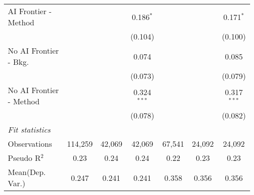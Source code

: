 \begin{tabular}{lcccccc}
   AI Frontier - Method    &               &               & 0.186$^{*}$   &               &               & 0.171$^{*}$\\   
                           &               &               & (0.104)       &               &               & (0.100)\\   
   No AI Frontier - Bkg.   &               &               & 0.074         &               &               & 0.085\\   
                           &               &               & (0.073)       &               &               & (0.079)\\   
   No AI Frontier - Method &               &               & 0.324$^{***}$ &               &               & 0.317$^{***}$\\   
                           &               &               & (0.078)       &               &               & (0.082)\\   
   \midrule
   \emph{Fit statistics}\\
   Observations            & 114,259       & 42,069        & 42,069        & 67,541        & 24,092        & 24,092\\  
   Pseudo R$^2$            & 0.23          & 0.24          & 0.24          & 0.22          & 0.23          & 0.23\\  
Mean(Dep. Var.) & 0.247 & 0.241 & 0.241 & 0.358 & 0.356 & 0.356 \\
   

\end{tabular}
